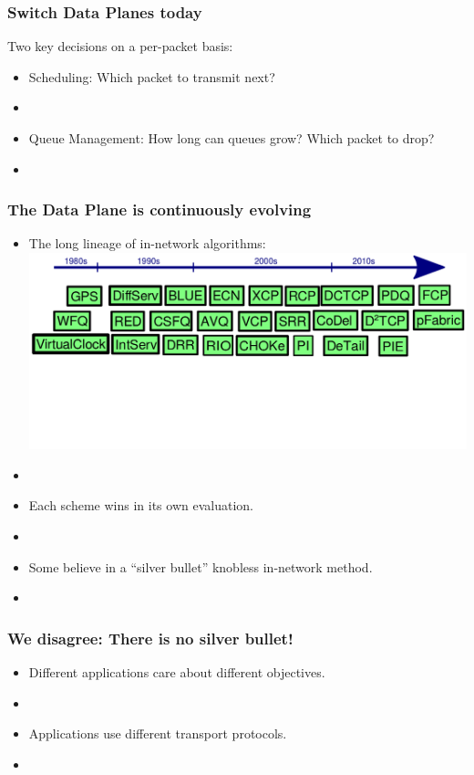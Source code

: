 \begin{Large}
\begin{frame}[plain]
\frametitle{Switch Data Planes today}
Two key decisions on a per-packet basis:
\begin{itemize}
\item Scheduling: Which packet to transmit next?
\item[]
\item Queue Management: How long can queues grow? Which packet to drop?
\item[]
\end{itemize}
\end{frame}

\begin{frame}[plain]
\frametitle{The Data Plane is continuously evolving}
\begin{itemize}
\item The long lineage of in-network algorithms:
\noindent \hspace{-.75 cm} \includegraphics[width=.9\textwidth]{march.png}
\vspace{-2cm}
\item[]
\item Each scheme wins in its own evaluation.
\item[]
\item Some believe in a ``silver bullet'' knobless in-network method.
\item[]

\end{itemize}
\end{frame}

\begin{frame}[plain]
\frametitle{We disagree: There is no silver bullet!}
\begin{itemize}
\item{Different applications care about different objectives.}
\item[]

\item{Applications use different transport protocols.}
\item[]


\end{itemize}
\end{frame}
\end{Large}
